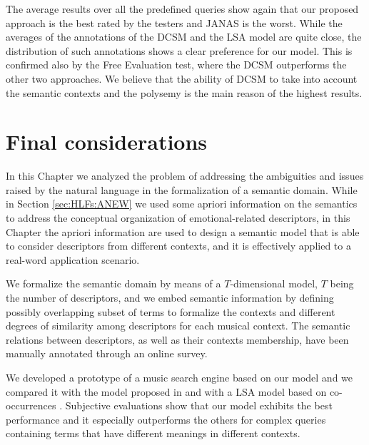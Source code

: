The average results over all the predefined queries  show again that our proposed approach is the best rated by the testers and JANAS is the worst. While the averages of the annotations of the DCSM and the LSA model are quite close, the distribution of such annotations shows a clear preference for our model. This is confirmed also by the Free Evaluation test, where the DCSM outperforms the other two approaches. We believe that the ability of DCSM to take into account the semantic contexts and the polysemy is the main reason of the highest results.  


\section{Final considerations}
\label{sec:DCSMconclusions}
In this Chapter we analyzed the problem of addressing the ambiguities and issues raised by the natural language in the formalization of a semantic domain. While in Section \ref{sec:HLFs:ANEW} we used some apriori information on the semantics to address the conceptual organization of emotional-related descriptors, in this Chapter the apriori information are used to design a semantic model that is able to consider descriptors from different contexts, and it is effectively applied to a real-word application scenario.

We formalize the semantic domain by means of a $T$-dimensional model, $T$ being  the number of descriptors, and we embed semantic information by defining possibly overlapping subset of terms to formalize the contexts and different degrees of similarity among descriptors for each musical context.  The semantic relations between descriptors, as well as their contexts membership, have been manually annotated through an online survey. 

We developed a prototype of a music search engine based on our model and we compared it %
with the model proposed in \cite{Buccoli2013} and with a LSA model based on co-occurrences \cite{Deerwester1990}. Subjective evaluations show that our model exhibits the best performance and it especially outperforms the others for complex queries containing terms that have different meanings in different contexts. 

